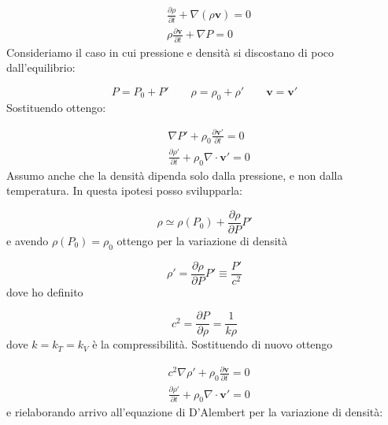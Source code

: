\documentclass[a4paper]{report}
\begin{document}
\begin{equation}
    \begin{split}
        &\frac{\partial \rho}{\partial t} + \nabla(\rho \mathbf{v}) = 0 \\
        &\rho \frac{\partial \mathbf{v}}{\partial t} + \nabla P = 0
    \end{split}
\end{equation}
Consideriamo il caso in cui pressione e densità si discostano di poco dall'equilibrio:

\begin{equation}
    P = P_0 + P' \qquad \rho = \rho_0 + \rho' \qquad \mathbf{v} = \mathbf{v}'
\end{equation}
Sostituendo ottengo:

\begin{equation}
    \begin{split}
        & \nabla P' + \rho_0 \frac{\partial \mathbf{v}'}{\partial t} = 0 \\
        & \frac{\partial \rho'}{\partial t} + \rho_0 \nabla \cdot \mathbf{v}' = 0
    \end{split}
\end{equation}
Assumo anche che la densità dipenda solo dalla pressione, e non dalla temperatura. In questa ipotesi posso svilupparla:

\begin{equation}
    \rho \simeq \rho(P_0) + \frac{\partial \rho}{\partial P} P'
\end{equation}
e avendo $\rho(P_0) = \rho_0$ ottengo per la variazione di densità

\begin{equation}
    \rho ' = \frac{\partial \rho}{\partial P} P' \equiv \frac{P'}{c^2}
\end{equation}
dove ho definito 

\begin{equation}
    c^2 = \frac{\partial P}{\partial \rho} = \frac{1}{k \rho}
\end{equation}
dove $k = k_T = k_V$ è la compressibilità. Sostituendo di nuovo ottengo

\begin{equation}
\begin{split}
    & c^2 \nabla \rho' + \rho_0 \frac{\partial \mathbf{v}}{\partial t} = 0 \\
    & \frac{\partial \rho'}{\partial t} + \rho_0 \nabla \cdot \mathbf{v}' = 0
\end{split}
\end{equation}
e rielaborando arrivo all'equazione di D'Alembert per la variazione di densità:
\end{document}
